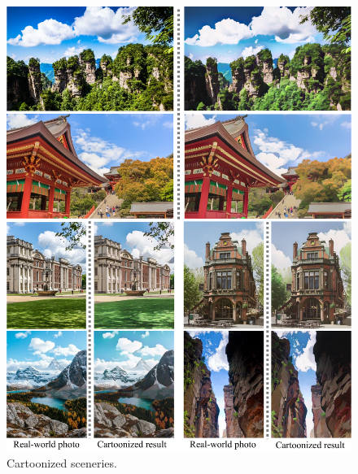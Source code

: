 \documentclass[10pt,twocolumn,letterpaper]{article}
\begin{document}
\begin{figure}[b]
\centering
\includegraphics[width=\linewidth]{figures/scenery1.pdf}
\caption{Cartoonized sceneries.}
\label{fig:scenery1}
\end{figure}
\end{document}
